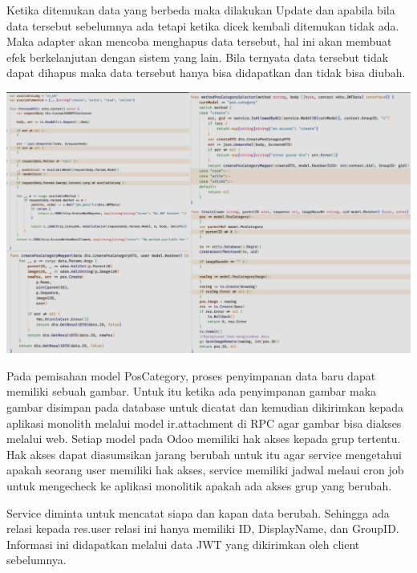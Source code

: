 Ketika ditemukan data yang berbeda maka dilakukan Update dan apabila bila data tersebut sebelumnya ada tetapi ketika dicek kembali ditemukan tidak ada. Maka adapter akan mencoba menghapus data tersebut, hal ini akan membuat efek berkelanjutan dengan sistem yang lain. Bila ternyata data tersebut tidak dapat dihapus maka data tersebut hanya bisa didapatkan dan tidak bisa diubah.

\begin{center}
	\includegraphics[width=14cm]{img/bab_4/strangle_3.png}
	\label{fig:strangle_3}
\end{center}

Pada pemisahan  model PosCategory, proses penyimpanan data baru dapat memiliki sebuah gambar. Untuk itu ketika ada penyimpanan gambar maka gambar disimpan pada database untuk dicatat dan kemudian dikirimkan kepada aplikasi monolith melalui model ir.attachment di RPC agar gambar bisa diakses melalui web. Setiap model pada Odoo memiliki hak akses kepada grup tertentu. Hak akses dapat diasumsikan jarang berubah untuk itu agar service mengetahui apakah seorang user memiliki hak akses, service memiliki jadwal melaui cron job untuk mengecheck ke aplikasi monolitik apakah ada akses grup yang berubah.

Service diminta untuk mencatat siapa dan kapan data berubah. Sehingga ada relasi kepada res.user relasi ini hanya memiliki ID, DisplayName, dan GroupID. Informasi ini didapatkan melalui data JWT yang dikirimkan oleh client sebelumnya. \\


